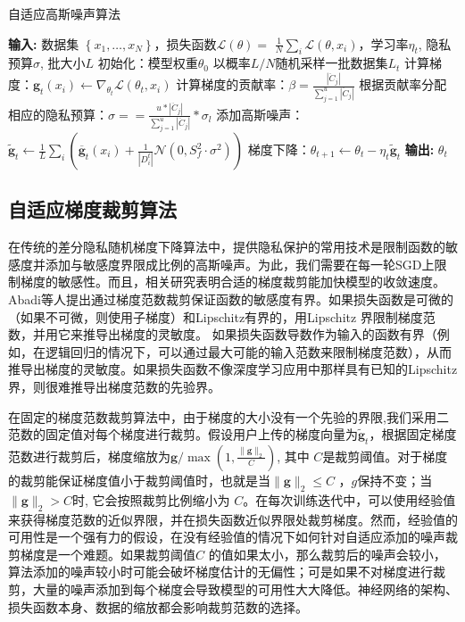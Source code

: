 \begin{algorithm}[!htb]
	\caption{自适应高斯噪声算法}
	\label{自适应高斯噪声算法}
	\begin{algorithmic}[1]
		\footnotesize
		\STATE \textbf{输入:} 数据集 $\left\{x_{1}, \ldots, x_{N}\right\}$，损失函数$\mathcal{L}(\theta)=$ $\frac{1}{N} \sum_{i} \mathcal{L}\left(\theta, x_{i}\right)$，学习率$\eta_{t}$, 隐私预算$\sigma$, 批大小$L$
		\STATE 初始化：模型权重$\theta_{0}$
			\STATE 以概率$L / N$随机采样一批数据集$L_{t}$
			\STATE 计算梯度：$\mathbf{g}_{t}\left(x_{i}\right) \leftarrow \nabla_{\theta_{t}} \mathcal{L}\left(\theta_{t}, x_{i}\right)$
			\STATE 计算梯度的贡献率：$\beta=\frac{\left|\ddot{C}_{j}\right|}{\sum_{j=1}^{u}\left|\ddot{C}_{j}\right|}$
			\STATE 根据贡献率分配相应的隐私预算：$\sigma==\frac{u *\left|\ddot{C}_{j}\right|}{\sum_{j=1}^{u}\left|\ddot{C}_{j}\right|} * \sigma_{l}$
			\STATE 添加高斯噪声：$\tilde{\mathbf{g}}_{t} \leftarrow \frac{1}{L} \sum_{i}\left(\overline{\mathbf{g}}_{t}\left(x_{i}\right)+\frac{1}{\left|D_{i}^{t}\right|}\mathcal{N}\left(0, S_{f}^{2} \cdot \sigma^{2}\right)\right)$
			\STATE 梯度下降：$\theta_{t+1} \leftarrow \theta_{t}-\eta_{t} \tilde{\mathbf{g}}_{t}$
		\ENDFOR
		\STATE \textbf{输出:} $\theta_{t}$
	\end{algorithmic}
\end{algorithm}

\subsection{自适应梯度裁剪算法}
在传统的差分隐私随机梯度下降算法中，提供隐私保护的常用技术是限制函数的敏感度并添加与敏感度界限成比例的高斯噪声。为此，我们需要在每一轮SGD上限制梯度的敏感性。而且，相关研究表明合适的梯度裁剪能加快模型的收敛速度。Abadi等人提出通过梯度范数裁剪保证函数的敏感度有界。如果损失函数是可微的（如果不可微，则使用子梯度）和Lipschitz有界的，用Lipschitz 界限制梯度范数，并用它来推导出梯度的灵敏度。 如果损失函数导数作为输入的函数有界（例如，在逻辑回归的情况下，可以通过最大可能的输入范数来限制梯度范数），从而推导出梯度的灵敏度。如果损失函数不像深度学习应用中那样具有已知的Lipschitz界，则很难推导出梯度范数的先验界。

在固定的梯度范数裁剪算法中，由于梯度的大小没有一个先验的界限,我们采用二范数的固定值对每个梯度进行裁剪。假设用户上传的梯度向量为$\tilde{\mathbf{g}}_{t}$，根据固定梯度范数进行裁剪后，梯度缩放为$\mathbf{g} / \max \left(1, \frac{\|\mathbf{g}\|_{2}}{C}\right)$, 其中 $C$是裁剪阈值。对于梯度的裁剪能保证梯度值小于裁剪阈值时，也就是当$\|\mathbf{g}\|_{2} \leq C$ ，$g$保持不变；当$\|\mathbf{g}\|_{2}>C$时, 它会按照裁剪比例缩小为 $C$。在每次训练迭代中，可以使用经验值来获得梯度范数的近似界限，并在损失函数近似界限处裁剪梯度。然而，经验值的可用性是一个强有力的假设，在没有经验值的情况下如何针对自适应添加的噪声裁剪梯度是一个难题。如果裁剪阈值$C$ 的值如果太小，那么裁剪后的噪声会较小，算法添加的噪声较小时可能会破坏梯度估计的无偏性；可是如果不对梯度进行裁剪，大量的噪声添加到每个梯度会导致模型的可用性大大降低。神经网络的架构、损失函数本身、数据的缩放都会影响裁剪范数的选择。

